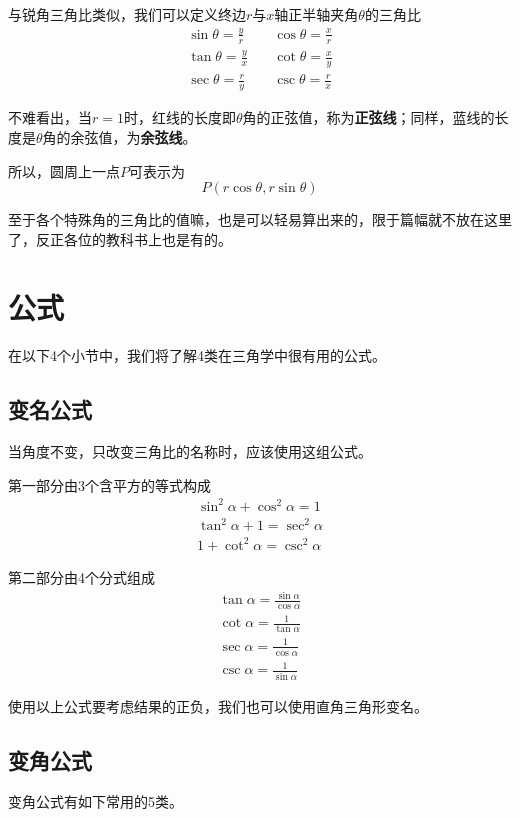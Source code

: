 与锐角三角比类似，我们可以定义终边$r$与$x$轴正半轴夹角$\theta$的三角比
\begin{align*}
    \sin\theta=\frac{y}{r}\quad & \cos\theta=\frac{x}{r} \\
    \tan\theta=\frac{y}{x}\quad & \cot\theta=\frac{x}{y} \\
    \sec\theta=\frac{r}{y}\quad & \csc\theta=\frac{r}{x}
\end{align*}

不难看出，当$r=1$时，红线的长度即$\theta$角的正弦值，称为\textbf{正弦线}；同样，蓝线的长度是$\theta$角的余弦值，为\textbf{余弦线}。

所以，圆周上一点$P$可表示为\[P(r\cos\theta,r\sin\theta)\]

至于各个特殊角的三角比的值嘛，也是可以轻易算出来的，限于篇幅就不放在这里了，反正各位的教科书上也是有的。

\section{公式}
在以下4个小节中，我们将了解4类在三角学中很有用的公式。

\subsection{变名公式}
当角度不变，只改变三角比的名称时，应该使用这组公式。

第一部分由3个含平方的等式构成
\begin{gather}
	\sin^2\alpha+\cos^2\alpha=1 \label{equ:trig-1} \\
	\tan^2\alpha+1=\sec^2\alpha \label{equ:trig-2}\\
	1+\cot^2\alpha=\csc^2\alpha \label{equ:trig-3}
\end{gather}

第二部分由4个分式组成
\begin{gather}
	\tan\alpha=\frac{\sin\alpha}{\cos\alpha} \label{equ:trig-4} \\
	\cot\alpha=\frac{1}{\tan\alpha} \label{equ:trig-5} \\
	\sec\alpha=\frac{1}{\cos\alpha} \label{equ:trig-6} \\
	\csc\alpha=\frac{1}{\sin\alpha} \label{equ:trig-7}
\end{gather}

使用以上公式要考虑结果的正负，我们也可以使用直角三角形变名。

\subsection{变角公式}
变角公式有如下常用的5类。

